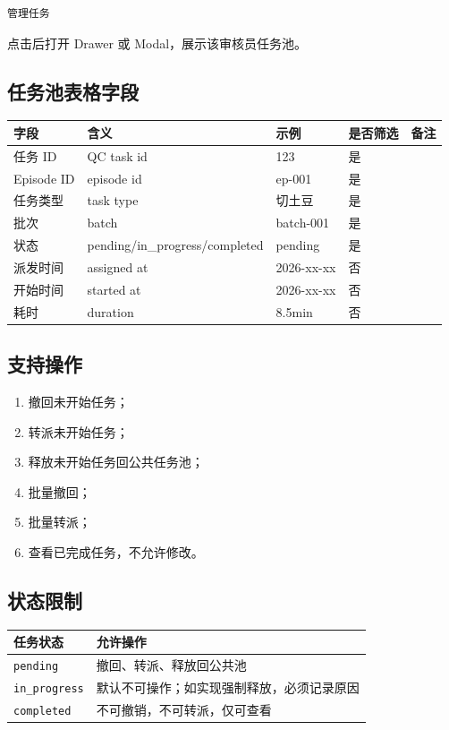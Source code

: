 \documentclass[UTF8,12pt,a4paper]{ctexart}
\begin{document}
\begin{lstlisting}
管理任务
\end{lstlisting}

点击后打开 Drawer 或 Modal，展示该审核员任务池。

\subsection{任务池表格字段}

\begin{longtable}{p{3cm}p{3cm}p{3cm}p{2.5cm}p{2.5cm}}
\toprule
字段 & 含义 & 示例 & 是否筛选 & 备注 \\
\midrule
任务 ID & QC task id & 123 & 是 & \\
Episode ID & episode id & ep-001 & 是 & \\
任务类型 & task type & 切土豆 & 是 & \\
批次 & batch & batch-001 & 是 & \\
状态 & pending/in\_progress/completed & pending & 是 & \\
派发时间 & assigned at & 2026-xx-xx & 否 & \\
开始时间 & started at & 2026-xx-xx & 否 & \\
耗时 & duration & 8.5min & 否 & \\
\bottomrule
\end{longtable}

\subsection{支持操作}

\begin{enumerate}
  \item 撤回未开始任务；
  \item 转派未开始任务；
  \item 释放未开始任务回公共任务池；
  \item 批量撤回；
  \item 批量转派；
  \item 查看已完成任务，不允许修改。
\end{enumerate}

\subsection{状态限制}

\begin{longtable}{p{4cm}p{8cm}}
\toprule
任务状态 & 允许操作 \\
\midrule
\texttt{pending} & 撤回、转派、释放回公共池 \\
\texttt{in\_progress} & 默认不可操作；如实现强制释放，必须记录原因 \\
\texttt{completed} & 不可撤销，不可转派，仅可查看 \\
\bottomrule
\end{longtable}
\end{document}
